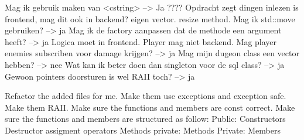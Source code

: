 Mag ik gebruik maken van <cstring> --> Ja
???? Opdracht zegt dingen inlezen is frontend, mag dit ook in backend?
eigen vector. resize method. Mag ik std::move gebruiken? --> ja
Mag ik de factory aanpassen dat de methode een argument heeft? --> ja
Logica moet in frontend. Player mag niet backend. Mag player enemies subscriben voor damage krijgen? --> ja
Mag mijn dugeon class een vector hebben? --> nee
Wat kan ik beter doen dan singleton voor de sql class? --> ja
Gewoon pointers doorsturen is wel RAII toch? --> ja

Refactor the added files for me.
Make them use exceptions and exception safe.
Make them RAII.
Make sure the functions and members are const correct.
Make sure the functions and members are structured as follow:
Public:
    Constructors
    Destructor
    assigment operators
    Methods
private:
    Methods
Private:
    Members